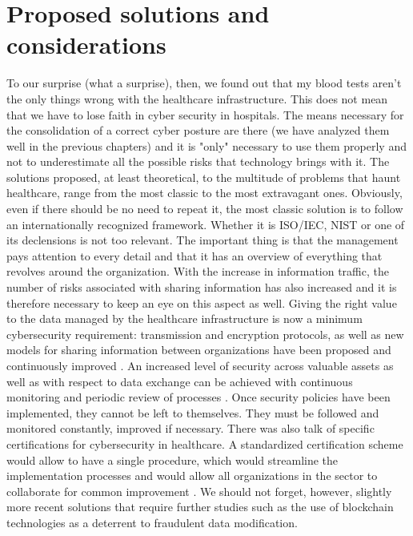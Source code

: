\section{Proposed solutions and considerations}
To our surprise (what a surprise), then, we found out that my blood tests aren't the only things wrong with the healthcare infrastructure. This does not mean that we have to lose faith in cyber security in hospitals. The means necessary for the consolidation of a correct cyber posture are there (we have analyzed them well in the previous chapters) and it is "only" necessary to use them properly and not to underestimate all the possible risks that technology brings with it. The solutions proposed, at least theoretical, to the multitude of problems that haunt healthcare, range from the most classic to the most extravagant ones. Obviously, even if there should be no need to repeat it, the most classic solution is to follow an internationally recognized framework. Whether it is ISO/IEC, NIST or one of its declensions is not too relevant. The important thing is that the management pays attention to every detail and that it has an overview of everything that revolves around the organization. With the increase in information traffic, the number of risks associated with sharing information has also increased and it is therefore necessary to keep an eye on this aspect as well. Giving the right value to the data managed by the healthcare infrastructure is now a minimum cybersecurity requirement: transmission and encryption protocols, as well as new models for sharing information between organizations have been proposed and continuously improved \cite{Hautamaki2020}.
An increased level of security across valuable assets as well as with respect to data exchange can be achieved with continuous monitoring and periodic review of processes \cite{Coppolino2019}. Once security policies have been implemented, they cannot be left to themselves. They must be followed and monitored constantly, improved if necessary. There was also talk of specific certifications for cybersecurity in healthcare. A standardized certification scheme would allow to have a single procedure, which would streamline the implementation processes and would allow all organizations in the sector to collaborate for common improvement \cite{Hovhannisyan2021}. We should not forget, however, slightly more recent solutions that require further studies such as the use of blockchain technologies as a deterrent to fraudulent data modification.\newline
